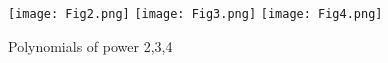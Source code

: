 \documentclass[]{report}
\begin{document}
\lipsum[1-3]
\begin{figure}[h]
    \centering
    \texttt{[image: Fig2.png]}
    \texttt{[image: Fig3.png]}
    \texttt{[image: Fig4.png]}
    \caption{Polynomials of power 2,3,4}\end{figure}
\end{document}
